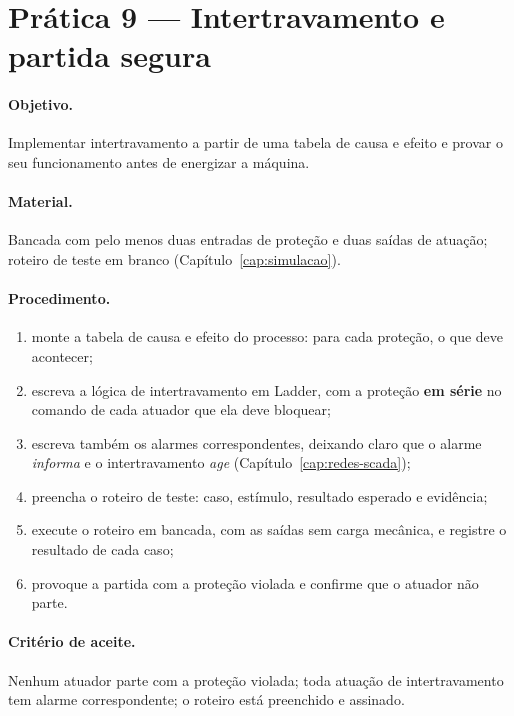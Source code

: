 \section{Prática 9 --- Intertravamento e partida segura}

\paragraph{Objetivo.} Implementar intertravamento a partir de uma tabela de causa e efeito e provar
o seu funcionamento antes de energizar a máquina.

\paragraph{Material.} Bancada com pelo menos duas entradas de proteção e duas saídas de atuação;
roteiro de teste em branco (Capítulo~\ref{cap:simulacao}).

\paragraph{Procedimento.}
\begin{enumerate}
  \item monte a tabela de causa e efeito do processo: para cada proteção, o que deve acontecer;
  \item escreva a lógica de intertravamento em Ladder, com a proteção \textbf{em série} no comando de
        cada atuador que ela deve bloquear;
  \item escreva também os alarmes correspondentes, deixando claro que o alarme \emph{informa} e o
        intertravamento \emph{age} (Capítulo~\ref{cap:redes-scada});
  \item preencha o roteiro de teste: caso, estímulo, resultado esperado e evidência;
  \item execute o roteiro em bancada, com as saídas sem carga mecânica, e registre o resultado de cada
        caso;
  \item provoque a partida com a proteção violada e confirme que o atuador não parte.
\end{enumerate}

\paragraph{Critério de aceite.} Nenhum atuador parte com a proteção violada; toda atuação de
intertravamento tem alarme correspondente; o roteiro está preenchido e assinado.

